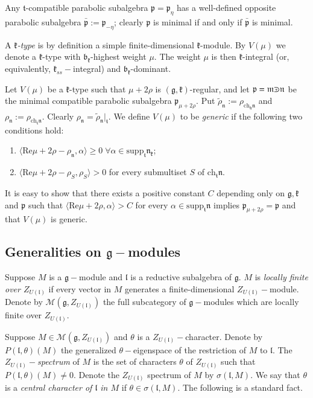 \documentclass[10pt]{amsart}
\newcommand{\supp}{\mathrm{supp}}
\newcommand{\ch}{\mathrm{ch}}
\newcommand{\bb}{\mathfrak{b}}
\renewcommand{\gg}{\mathfrak{g}}
\newcommand{\hh}{\mathfrak{h}}
\newcommand{\kk}{\mathfrak{k}}
\renewcommand{\ll}{\mathfrak{l}}
\newcommand{\mm}{\mathfrak{m}}
\newcommand{\nn}{\mathfrak{n}}
\newcommand{\pp}{\mathfrak{p}}
\renewcommand{\tt}{\mathfrak{t}}
\def\crplus{\hbox{$\supset${\raise1.05pt\hbox{\kern -0.55em ${\scriptscriptstyle +}$}}\ }}
\begin{document}
Any $\tt$-compatible parabolic subalgebra $\pp =\pp_\eta$ has a well-defined opposite parabolic subalgebra $\bar{\pp}:=\pp_{-\eta}$; clearly $\pp$ is minimal if and only if $\bar{\pp}$ is minimal.

A \textit{$\kk$-type} is by definition a simple finite-dimensional $\kk$-module. By $V(\mu)$ we denote a $\kk$-type with $\bb_\kk$-highest weight $\mu$. The weight $\mu$ is then $\kk$-integral (or, equivalently, $\kk_{ss}-$integral) and $\bb_\kk$-dominant.

Let $V(\mu)$ be a $\kk$-type such that $\mu+2\rho$ is $(\gg,\kk)$-regular, and let $\pp=\mm\crplus\nn$ be the minimal compatible parabolic subalgebra $\pp_{\mu+2\rho}$. Put $\tilde{\rho}_\nn :=\rho_{\ch_\hh \nn}$ and $\rho_\nn:=\rho_{\ch_\tt\nn}$. Clearly $\rho_\nn =\tilde{\rho}_\nn |_\tt$. We define $V(\mu)$ to be \textit{generic} if the following two conditions hold:
\begin{enumerate}
\item $\langle\mathrm{Re}\mu+2\rho-\rho_\nn,\alpha\rangle\geq 0\;\forall\alpha\in\supp_\tt\nn_\kk$;
\item $\langle\mathrm{Re}\mu+2\rho-\rho_S,\rho_S\rangle >0$ for every submultiset $S$ of $\ch_\tt\nn$.
\end{enumerate}

It is easy to show that there exists a positive constant $C$ depending only on $\gg,\kk$ and $\pp$ such that $\langle\mathrm{Re}\mu+2\rho,\alpha\rangle >C$ for every $\alpha\in\supp_\tt\nn$ implies $\pp_{\mu+2\rho}=\pp$ and that $V(\mu)$ is generic.

\subsection{Generalities on $\gg-$modules}\label{sect:1.3}

Suppose $M$ is a $\gg-$module and $\ll$ is a reductive subalgebra of $\gg$. $M$ is \textit{locally finite over $Z_{U(\ll)}$} if every vector in $M$ generates a finite-dimensional $Z_{U(\ll)}-$module. Denote by $\mathcal{M}(\gg,Z_{U(\ll)})$ the full subcategory of $\gg-$modules which are locally finite over $Z_{U(\ll)}$. 

Suppose $M \in \mathcal{M}(\gg,Z_{U(\ll)})$ and $\theta$ is a $Z_{U(\ll)}-$character. Denote by $P(\ll, \theta)(M)$ the generalized $\theta-$eigenspace of the restriction of $M$ to $\ll$. The $Z_{U(\ll)}-$\textit{spectrum} of $M$ is the set of characters $\theta$ of $Z_{U(\ll)}$ such that $P(\ll, \theta)(M) \neq 0$. Denote the $Z_{U(\ll)}$ spectrum of $M$ by $\sigma(\ll,M)$. We say that $\theta$ is a \textit{central character of $\ll$ in $M$} if $\theta \in \sigma(\ll,M)$. The following is a standard fact.
\end{document}
